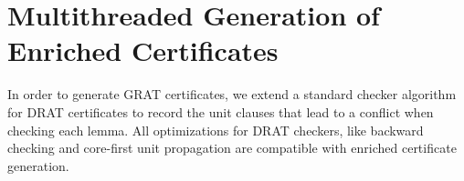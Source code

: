 \documentclass{llncs}
\begin{document}
%     
%   
%   
%       
%       
%     
%     
    
\section{Multithreaded Generation of Enriched Certificates}\label{sec:gratgen}
In order to generate GRAT certificates, we extend a standard checker algorithm for DRAT certificates 
to record the unit clauses that lead to a conflict when checking each lemma. 
All optimizations for DRAT checkers, like backward checking and core-first unit propagation are compatible with enriched certificate generation.
\end{document}
